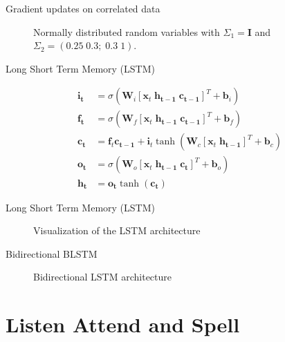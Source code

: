 \documentclass{beamer}
\begin{document}
\begin{frame}{Gradient updates on correlated data}
\begin{figure}
	
	
	\caption{Normally distributed random variables with $
	\Sigma_1 = \mathbf{I}$ and $\Sigma_2 = (0.25 \; 0.3; \; 0.3 \; 1)$. }
\end{figure}
\end{frame}



\begin{frame}{Long Short Term Memory (LSTM)}

\begin{align}
\mathbf{i_t} &= \sigma (\mathbf{W}_i [\mathbf{x}_t \; \mathbf{h_{t-1}} \; \mathbf{c_{t-1}}]^T + \mathbf{b}_i) \\
\mathbf{f_t} &= \sigma (\mathbf{W}_f [\mathbf{x}_t \; \mathbf{h_{t-1}} \; \mathbf{c_{t-1}}]^T + \mathbf{b}_f) \\
\mathbf{c_t} &= \mathbf{f}_t \mathbf{c_{t-1}} + \mathbf{i}_t \tanh( \mathbf{W}_c [\mathbf{x}_t \; \mathbf{h_{t-1}}]^T + \mathbf{b}_c ) \\
\mathbf{o_t} &= \sigma (\mathbf{W}_o [\mathbf{x}_t \; \mathbf{h_{t-1}} \; \mathbf{c_t}]^T + \mathbf{b}_o ) \\
\mathbf{h_t} &= \mathbf{o_t} \tanh(\mathbf{c_t})
\end{align}

\end{frame}

\begin{frame}{Long Short Term Memory (LSTM)}
\begin{figure}

\caption{Visualization of the LSTM architecture}
\label{fig:lstm}
\end{figure}
\end{frame}

\begin{frame}{Bidirectional BLSTM}
\begin{figure}

\caption{Bidirectional LSTM architecture}
\label{fig:blstm}
\end{figure}
\end{frame}


\section{Listen Attend and Spell}
\end{document}
